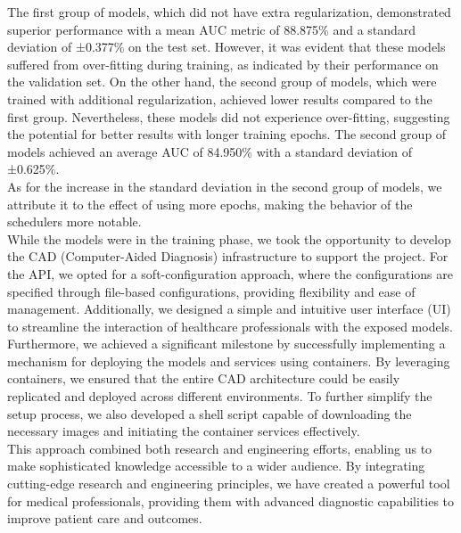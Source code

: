 The first group of models, which did not have extra regularization,
demonstrated superior performance with a mean AUC metric of 88.875\% and a
standard deviation of ±0.377\% on the test set. However, it was evident that
these models suffered from over-fitting during training, as indicated by their
performance on the validation set. On the other hand, the second group of
models, which were trained with additional regularization, achieved lower
results compared to the first group. Nevertheless, these models did not
experience over-fitting, suggesting the potential for better results with longer
training epochs. The second group of models achieved an average AUC of 84.950\%
with a standard deviation of ±0.625\%. \\

As for the increase in the standard deviation in the second group of models, we
attribute it to the effect of using more epochs, making the behavior of the
schedulers more notable. \\

While the models were in the training phase, we took the opportunity to develop
the CAD (Computer-Aided Diagnosis) infrastructure to support the project. For
the API, we opted for a soft-configuration approach, where the configurations
are specified through file-based configurations, providing flexibility and ease
of management. Additionally, we designed a simple and intuitive user interface
(UI) to streamline the interaction of healthcare professionals with the exposed
models. \\

Furthermore, we achieved a significant milestone by successfully implementing a
mechanism for deploying the models and services using containers. By leveraging
containers, we ensured that the entire CAD architecture could be easily
replicated and deployed across different environments. To further simplify the
setup process, we also developed a shell script capable of downloading the
necessary images and initiating the container services effectively. \\

This approach combined both research and engineering efforts, enabling us to
make sophisticated knowledge accessible to a wider audience. By integrating
cutting-edge research and engineering principles, we have created a powerful
tool for medical professionals, providing them with advanced diagnostic
capabilities to improve patient care and outcomes. \\

